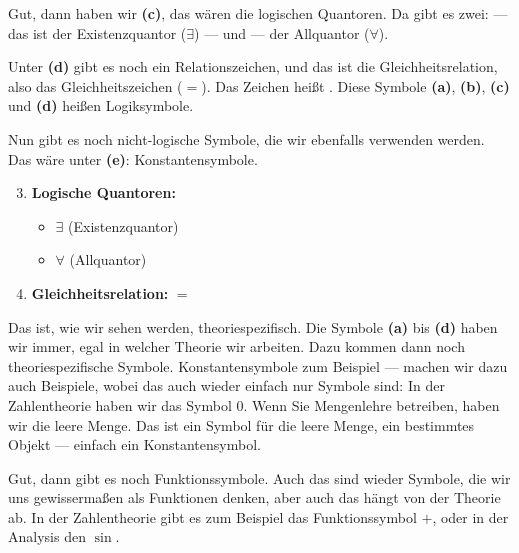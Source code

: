 \begin{spoken-clean}[00:34:00 - 00:35:25]
Gut, dann haben wir \textbf{(c)}, das wären die logischen Quantoren.  Da gibt es zwei:  --- das ist der Existenzquantor ($\exists$) --- und  --- der Allquantor ($\forall$). 

Unter \textbf{(d)} gibt es noch ein Relationszeichen, und das ist die Gleichheitsrelation, also das Gleichheitszeichen ($=$). Das Zeichen heißt . Diese Symbole \textbf{(a)}, \textbf{(b)}, \textbf{(c)} und \textbf{(d)} heißen Logiksymbole. 

Nun gibt es noch nicht-logische Symbole, die wir ebenfalls verwenden werden. Das wäre unter \textbf{(e)}: Konstantensymbole.
\end{spoken-clean}

\begin{math-stroke}
\begin{enumerate}[label=\textbf{(\alph*)}]
    \setcounter{enumi}{2}
    \item \textbf{Logische Quantoren:}
    \begin{itemize}
        \item $\exists$ (Existenzquantor)
        \item $\forall$ (Allquantor)
    \end{itemize}
    \item \textbf{Gleichheitsrelation:} $=$
\end{enumerate}
\end{math-stroke}

\begin{spoken-clean}[00:35:25 - 00:37:35]
Das ist, wie wir sehen werden, theoriespezifisch. Die Symbole \textbf{(a)} bis \textbf{(d)} haben wir immer, egal in welcher Theorie wir arbeiten. Dazu kommen dann noch theoriespezifische Symbole. Konstantensymbole zum Beispiel --- machen wir dazu auch Beispiele, wobei das auch wieder einfach nur Symbole sind: In der Zahlentheorie haben wir das Symbol $0$. Wenn Sie Mengenlehre betreiben, haben wir die leere Menge. Das ist ein Symbol für die leere Menge, ein bestimmtes Objekt --- einfach ein Konstantensymbol. 

Gut, dann gibt es noch Funktionssymbole. Auch das sind wieder Symbole, die wir uns gewissermaßen als Funktionen denken, aber auch das hängt von der Theorie ab. In der Zahlentheorie gibt es zum Beispiel das Funktionssymbol $+$, oder in der Analysis den $\sin$.
\end{spoken-clean}

